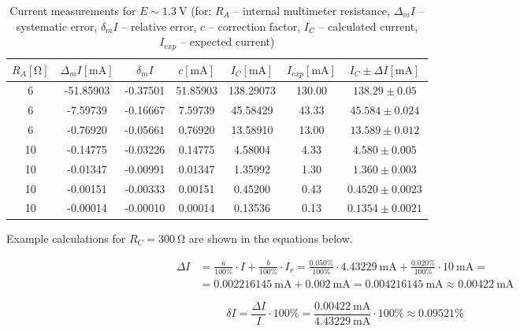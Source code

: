\begin{table}[H]
	\centering
	\begin{tabular}{c | c | c | c | c | c | c}
		$R_A [\unit{\ohm}]$ & $\Delta_m I [\unit{\milli\ampere}]$ & $\delta_m I$ & $c [\unit{\milli\ampere}]$ & $I_C [\unit{\milli\ampere}]$ & $I_{exp} [\unit{\milli\ampere}]$ & $I_C \pm \Delta I [\unit{\milli\ampere}]$\\
		\hline
		6	& -51.85903&	-0.37501&	51.85903&	138.29073&	130.00& $138.29\pm 0.05$\\
		6&	-7.59739&	-0.16667&	7.59739&	45.58429&	43.33&$45.584\pm 0.024$\\
		6	&-0.76920	&-0.05661&	0.76920&	13.58910&	13.00& $13.589\pm 0.012$\\
		10	&-0.14775&	-0.03226&	0.14775&	4.58004&	4.33& $4.580\pm 0.005$\\
		10&	-0.01347&	-0.00991&	0.01347&	1.35992&	1.30& $1.360\pm 0.003$\\
		10&	-0.00151&	-0.00333&	0.00151&	0.45200&	0.43&$0.4520\pm 0.0023$\\
		10&	-0.00014&	-0.00010&	0.00014&	0.13536&	0.13& $0.1354\pm 0.0021$\\
	\end{tabular}
	\caption{Current measurements for $E\sim\SI{1.3}{\volt}$ (for: $R_A$ -- internal multimeter resistance, $\Delta_m I$ -- systematic error, $\delta_m I$ -- relative error, $c$ -- correction factor, $I_C$ -- calculated current,  $I_{exp}$ -- expected current)}
	\label{tab:direct_digital_2}
\end{table}

Example calculations for $R_C = \SI{300}{\ohm}$ are shown in the equations below.

\begin{equation}
	\begin{split}
		\Delta I &= \frac{a}{100\unit{\percent}}\cdot I + 	\frac{b}{100\unit{\percent}}\cdot I_r = \frac{0.050\unit{\percent}}{100\unit{\percent}}\cdot\SI{4.43229}{\milli\ampere} + \frac{0.020\unit{\percent}}{100\unit{\percent}}\cdot\SI{10}{\milli\ampere} =\\
		&= \SI{0.002216145}{\milli\ampere} + \SI{0,002}{\milli\ampere} = \SI{0.004216145}{\milli\ampere}\approx\SI{0.00422}{\milli\ampere}
	\end{split}
\end{equation}

\begin{equation}
	\delta I = \frac{\Delta I}{I}\cdot 100\unit{\percent} = \frac{\SI{0.00422}{\milli\ampere}}{\SI{4.43229}{\milli\ampere}}\cdot 100\unit{\percent} \approx 0.09521\unit{\percent}
\end{equation}

